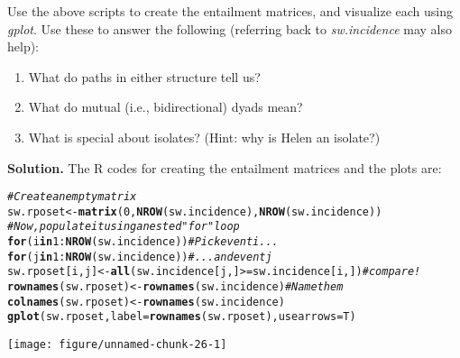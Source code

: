 \documentclass[11pt, oneside]{article}\usepackage[]{graphicx}\usepackage[]{color}
\makeatletter
\def\maxwidth{ %
  \ifdim\Gin@nat@width>\linewidth
    \linewidth
  \else
    \Gin@nat@width
  \fi
}
\newcommand{\hlnum}[1]{\textcolor[rgb]{0.686,0.059,0.569}{#1}}%
\newcommand{\hlcom}[1]{\textcolor[rgb]{0.678,0.584,0.686}{\textit{#1}}}%
\newcommand{\hlopt}[1]{\textcolor[rgb]{0,0,0}{#1}}%
\newcommand{\hlstd}[1]{\textcolor[rgb]{0.345,0.345,0.345}{#1}}%
\newcommand{\hlkwa}[1]{\textcolor[rgb]{0.161,0.373,0.58}{\textbf{#1}}}%
\newcommand{\hlkwb}[1]{\textcolor[rgb]{0.69,0.353,0.396}{#1}}%
\newcommand{\hlkwc}[1]{\textcolor[rgb]{0.333,0.667,0.333}{#1}}%
\newcommand{\hlkwd}[1]{\textcolor[rgb]{0.737,0.353,0.396}{\textbf{#1}}}%
\newenvironment{kframe}{%
 \def\at@end@of@kframe{}%
 \ifinner\ifhmode%
  \def\at@end@of@kframe{\end{minipage}}%
  \begin{minipage}{\columnwidth}%
 \fi\fi%
 \def\FrameCommand##1{\hskip\@totalleftmargin \hskip-\fboxsep
 \colorbox{shadecolor}{##1}\hskip-\fboxsep
     \hskip-\linewidth \hskip-\@totalleftmargin \hskip\columnwidth}%
 \MakeFramed {\advance\hsize-\width
   \@totalleftmargin\z@ \linewidth\hsize
   \@setminipage}}%
 {\par\unskip\endMakeFramed%
 \at@end@of@kframe}
\newenvironment{knitrout}{}{} %
\newenvironment{solution}{\begin{trivlist} \item \textbf{Solution.}}{\end{trivlist}}
\newenvironment{prob}[2][Problem]{\begin{trivlist}
\item[\hskip \labelsep {\bfseries #1}\hskip \labelsep {\bfseries #2.}]}{\end{trivlist}}
\makeatother
\begin{document}
\begin{prob}{2}
\begin{enumerate}
\noindent
Use the above scripts to create the entailment matrices, and visualize each using \emph{gplot}. Use these to answer the following (referring back to  \emph{sw.incidence} may also help):

\begin{enumerate}
\item What do paths in either structure tell us?
\item What do mutual (i.e., bidirectional) dyads mean?
\item What is special about isolates? (Hint: why is Helen an isolate?)
\end{enumerate}

\begin{solution}
The R codes for creating the entailment matrices and the plots are:
\begin{knitrout}
\color{fgcolor}\begin{kframe}
\begin{alltt}
\hlcom{#Create an empty matrix}
\hlstd{sw.rposet}\hlkwb{<-}\hlkwd{matrix}\hlstd{(}\hlnum{0}\hlstd{,}\hlkwd{NROW}\hlstd{(sw.incidence),} \hlkwd{NROW}\hlstd{(sw.incidence))}
\hlcom{#Now, populate it using a nested "for" loop}
\hlkwa{for}\hlstd{(i} \hlkwa{in} \hlnum{1}\hlopt{:}\hlkwd{NROW}\hlstd{(sw.incidence))} \hlcom{#Pick event i...}
  \hlkwa{for}\hlstd{(j} \hlkwa{in} \hlnum{1}\hlopt{:}\hlkwd{NROW}\hlstd{(sw.incidence))} \hlcom{# ... and event j}
    \hlstd{sw.rposet[i,j]}\hlkwb{<-}\hlkwd{all}\hlstd{(sw.incidence[j,]}\hlopt{>=}\hlstd{sw.incidence[i,])}\hlcom{#compare!}
\hlkwd{rownames}\hlstd{(sw.rposet)}\hlkwb{<-}\hlkwd{rownames}\hlstd{(sw.incidence)} \hlcom{#Name them}
\hlkwd{colnames}\hlstd{(sw.rposet)}\hlkwb{<-}\hlkwd{rownames}\hlstd{(sw.incidence)}
\hlkwd{gplot}\hlstd{(sw.rposet,}\hlkwc{label}\hlstd{=}\hlkwd{rownames}\hlstd{(sw.rposet),}\hlkwc{usearrows}\hlstd{=T)}
\end{alltt}
\end{kframe}

{\centering \texttt{[image: figure/unnamed-chunk-26-1]} 

}




\end{knitrout}
\end{solution}
\end{enumerate}
\end{prob}
\end{document}
